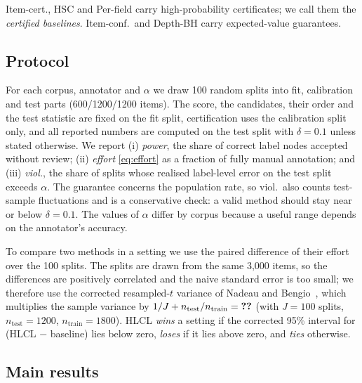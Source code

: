 \documentclass[preprint,12pt]{elsarticle}
\theoremstyle{definition}
\theoremstyle{remark}
\newcommand{\hlcl}{\textup{\textsc{HLCL}}}
\begin{document}
Item-cert., HSC and Per-field carry high-probability certificates; we call them
the \emph{certified baselines}. Item-conf.\ and Depth-BH carry expected-value
guarantees.

\subsection{Protocol}
\label{sec:exp-proto}

For each corpus, annotator and $\alpha$ we draw 100 random splits into fit,
calibration and test parts (600/1200/1200 items). The score, the candidates,
their order and the test statistic are fixed on the fit split, certification
uses the calibration split only, and all reported numbers are computed on the
test split with $\delta=0.1$ unless stated otherwise. We report (i)
\emph{power}, the share of correct label nodes accepted without review; (ii)
\emph{effort} \eqref{eq:effort} as a fraction of fully manual annotation; and
(iii) \emph{viol.}, the share of splits whose realised label-level error on the
test split exceeds $\alpha$. The guarantee concerns the population rate, so
viol.\ also counts test-sample fluctuations and is a conservative check: a valid
method should stay near or below $\delta=0.1$. The values of $\alpha$ differ by
corpus because a useful range depends on the annotator's accuracy.

To compare two methods in a setting we use the paired difference of their effort
over the 100 splits. The splits are drawn from the same 3,000 items, so the
differences are positively correlated and the naive standard error is too
small; we therefore use the corrected resampled-$t$ variance of Nadeau and
Bengio~\cite{nadeau2003inference}, which multiplies the sample variance by
$1/J+n_{\mathrm{test}}/n_{\mathrm{train}}=\stat{s@nbfactor}$ (with $J=100$
splits, $n_{\mathrm{test}}=1200$, $n_{\mathrm{train}}=1800$). \hlcl{}
\emph{wins} a setting if the corrected 95\% interval for (\hlcl{} $-$ baseline)
lies below zero, \emph{loses} if it lies above zero, and \emph{ties}
otherwise.

\subsection{Main results}
\label{sec:exp-results}

\begin{table}[t]
\centering
\scriptsize
\setlength{\tabcolsep}{2.5pt}
\caption{Effort / power (100 splits). Lower effort is better. The first four
columns carry high-probability certificates; Item-conf.\ and Depth-BH control
an expectation; $s\ge0.9$ has no guarantee. Item-cert.$^\ast$ is the best of three test
choices in each row. Bold: lowest effort among the certified methods that met
the label-level target in the row. $^\dagger$: the realised error exceeded $\alpha$
in more than $10\%$ of splits.}
\label{tab:main}

\end{table}
\end{document}

